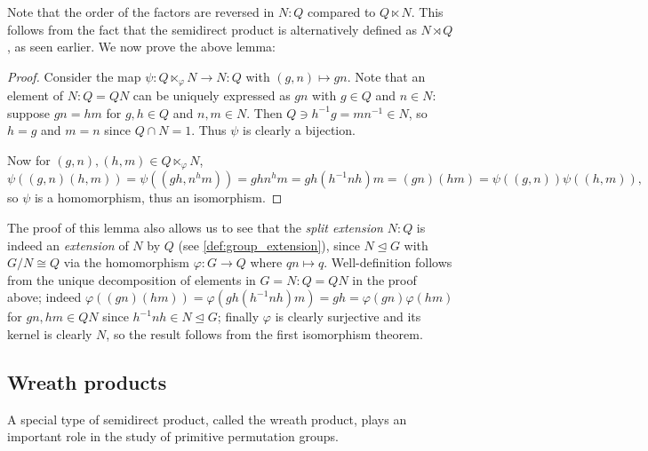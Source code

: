 Note that the order of the factors are reversed in $N : Q$ compared to $Q \ltimes N$. This follows from the fact that the semidirect product is alternatively defined as $N \rtimes Q$, as seen earlier. We now prove the above lemma:

\begin{proof}
    Consider the map $\psi : Q \ltimes_\varphi N \to N : Q$ with $(g,n) \mapsto gn$. Note that an element of $N : Q = QN$ can be uniquely expressed as $gn$ with $g \in Q$ and $n \in N$: suppose $gn = hm$ for $g,h \in Q$ and $n,m \in N$. Then $Q \ni h^{-1}g = mn^{-1} \in N$, so $h = g$ and $m = n$ since $Q \cap N = 1$. Thus $\psi$ is clearly a bijection.

    Now for $(g,n),(h,m) \in Q \ltimes_\varphi N$,
    $$\psi((g,n)(h,m)) = \psi((gh,n^hm)) = ghn^hm = gh(h^{-1}nh)m = (gn)(hm) = \psi((g,n))\psi((h,m)),$$
    so $\psi$ is a homomorphism, thus an isomorphism.
\end{proof}

The proof of this lemma also allows us to see that the \textit{split extension} $N : Q$ is indeed an \textit{extension} of $N$ by $Q$ (see \autoref{def:group_extension}), since $N \unlhd G$ with $G/N \cong Q$ via the homomorphism $\varphi : G \to Q$ where $qn \mapsto q$. Well-definition follows from the unique decomposition of elements in $G = N : Q = QN$ in the proof above; indeed $\varphi((gn)(hm)) = \varphi(gh(h^{-1}nh)m) = gh = \varphi(gn)\varphi(hm)$ for $gn,hm \in QN$ since $h^{-1}nh \in N \unlhd G$; finally $\varphi$ is clearly surjective and its kernel is clearly $N$, so the result follows from the first isomorphism theorem.


\subsection{Wreath products}

A special type of semidirect product, called the wreath product, plays an important role in the study of primitive  permutation groups.

